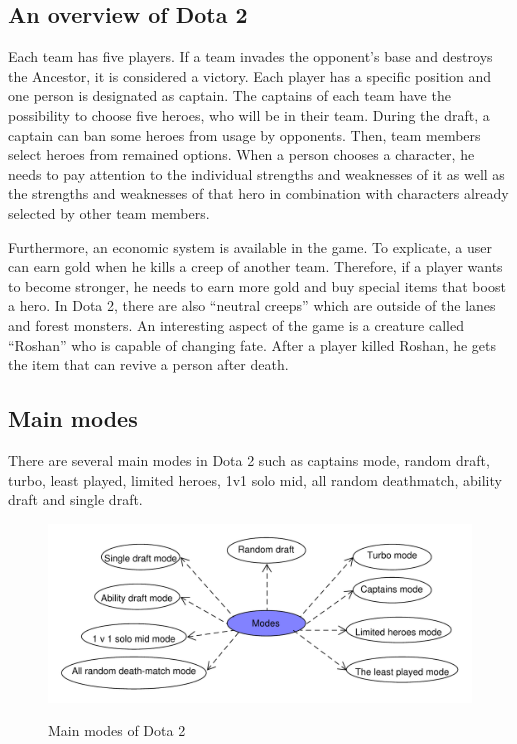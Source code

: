 \documentclass[12pt,twoside,english,a4paper]{article}
\begin{document}
\subsection{An overview of Dota 2} \label{overview}


Each team has five players. If a team invades the opponent’s base and destroys the Ancestor, it is considered a victory. Each player has a specific position and one person is designated as captain. The captains of each team have the possibility to choose five heroes, who will be in their team. During the draft, a captain can ban some heroes from usage by opponents. Then, team members select heroes from remained options. When a person chooses a character, he needs to pay attention to the individual strengths and weaknesses of it as well as the strengths and weaknesses of that hero in combination with characters already selected by other team members\cite{Conley:Dota}. 

Furthermore, an economic system is available in the game. To explicate, a user can earn gold when he kills a creep of another team. Therefore, if a player wants to become stronger, he needs to earn more gold and buy special items that boost a hero.
In Dota 2, there are also “neutral creeps” which are outside of the lanes and forest monsters. An interesting aspect of the game is a creature called “Roshan” who is capable of changing fate. After a player killed Roshan, he gets the item that can revive a person after death.



\subsection{Main modes} \label{main modes}

There are several main modes in Dota 2 such as captains mode, random draft, turbo, least played, limited heroes, 1v1 solo mid, all random deathmatch, ability draft and single draft.
\begin{figure}
  \centering
  \caption{Main modes of Dota 2\cite{ Modes:Nathan}}
  \includegraphics[width=1.0\textwidth]{modes123094.pdf}
  \label{fig:modes}
\end{figure}  
\end{document}
